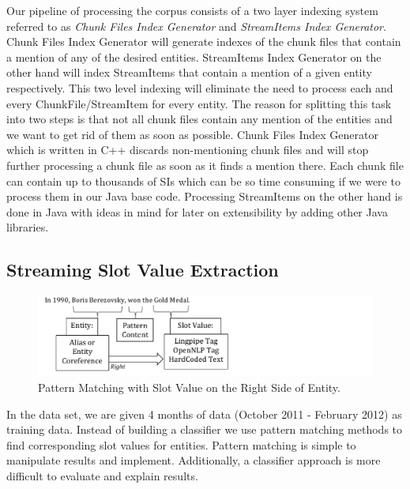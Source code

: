 Our pipeline of processing the corpus consists of a two layer indexing system 
referred to as \textit{Chunk Files Index Generator} and \textit{StreamItems Index Generator}.
Chunk Files Index Generator will generate indexes of the chunk files 
that contain a mention of any of the desired entities. StreamItems Index Generator 
on the other hand will index StreamItems that contain a mention of a given entity 
respectively. This two level indexing will eliminate the need to process each and 
every ChunkFile/StreamItem for every entity. The reason for splitting this task 
into two steps is that not all chunk files contain any mention of the entities and 
we want to get rid of them as soon as possible. Chunk Files Index Generator which 
is written in C++ discards non-mentioning chunk files and will stop further 
processing a chunk file as soon as it finds a mention there. Each chunk file can 
contain up to thousands of SIs which can be so time consuming if we were to 
process them in our Java base code. Processing StreamItems on the other hand is 
done in Java with ideas in mind for later on extensibility by adding other Java libraries.



\subsection{Streaming Slot Value Extraction}
\label{sec:ssve}
\begin{figure}
\centering
\includegraphics[width = 13cm]{./images/Pattern-crop.pdf}
\vspace*{-.1in} \caption{Pattern Matching with Slot Value on the Right Side of Entity. }\label{fig:pattern}
\vspace*{-.2in}
\end{figure}

In the data set, we are given 4 months of data (October 2011 - February 2012) as training data.
Instead of building a classifier we use pattern matching methods to find
corresponding slot values for entities. 
Pattern matching is simple to manipulate results and implement.
Additionally, a classifier approach is more difficult to evaluate and explain results.

